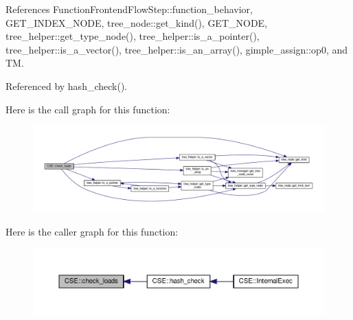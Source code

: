 References Function\+Frontend\+Flow\+Step\+::function\+\_\+behavior, G\+E\+T\+\_\+\+I\+N\+D\+E\+X\+\_\+\+N\+O\+DE, tree\+\_\+node\+::get\+\_\+kind(), G\+E\+T\+\_\+\+N\+O\+DE, tree\+\_\+helper\+::get\+\_\+type\+\_\+node(), tree\+\_\+helper\+::is\+\_\+a\+\_\+pointer(), tree\+\_\+helper\+::is\+\_\+a\+\_\+vector(), tree\+\_\+helper\+::is\+\_\+an\+\_\+array(), gimple\+\_\+assign\+::op0, and TM.



Referenced by hash\+\_\+check().

Here is the call graph for this function\+:
\nopagebreak
\begin{figure}[H]
\begin{center}
\leavevmode
\includegraphics[width=350pt]{d1/d73/classCSE_ac4ffe21033c163f44c7117e78da4d50e_cgraph}
\end{center}
\end{figure}
Here is the caller graph for this function\+:
\nopagebreak
\begin{figure}[H]
\begin{center}
\leavevmode
\includegraphics[width=350pt]{d1/d73/classCSE_ac4ffe21033c163f44c7117e78da4d50e_icgraph}
\end{center}
\end{figure}
\mbox{\label{classCSE_a0a111aeea50dcdf012272ad684136558}} 
